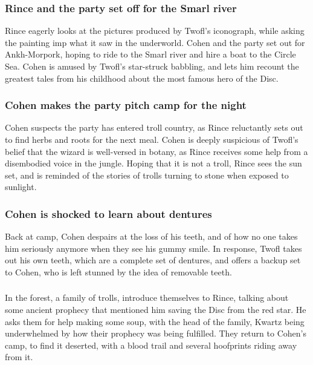 \subsubsection{\Gls{Rince} and the party set off for the Smarl river}
\Gls{Rince} eagerly looks at the pictures produced by \Gls{Twofl}'s iconograph, while asking the
painting imp what it saw in the underworld. \Gls{Cohen} and the party set out for Ankh-Morpork,
hoping to ride to the Smarl river and hire a boat to the Circle Sea. \Gls{Cohen} is amused by
\Gls{Twofl}'s star-struck babbling, and lets him recount the greatest tales from his childhood about
the most famous hero of the Disc.

\subsubsection{\Gls{Cohen} makes the party pitch camp for the night}
\Gls{Cohen} suspects the party has entered troll country, as \Gls{Rince} reluctantly sets out to
find herbs and roots for the next meal. \Gls{Cohen} is deeply suspicious of \Gls{Twofl}'s belief
that the wizard is well-versed in botany, as \Gls{Rince} receives some help from a disembodied
voice in the jungle. Hoping that it is not a troll, \Gls{Rince} sees the sun set, and is reminded of
the stories of trolls turning to stone when exposed to sunlight.

\subsubsection{\Gls{Cohen} is shocked to learn about dentures}
Back at camp, \Gls{Cohen} despairs at the loss of his teeth, and of how no one takes him seriously
anymore when they see his gummy smile. In response, \Gls{Twofl} takes out his own teeth, which are
a complete set of dentures, and offers a backup set to \Gls{Cohen}, who is left stunned by the
idea of removable teeth.

\subsubsection{}
In the forest, a family of trolls, introduce themselves to \Gls{Rince}, talking about some ancient
prophecy that mentioned him saving the Disc from the red star. He asks them for help making some
soup, with the head of the family, \Gls{Kwartz} being underwhelmed by how their prophecy was
being fulfilled. They return to \Gls{Cohen}'s camp, to find it deserted, with a blood trail and
several hoofprints riding away from it.

